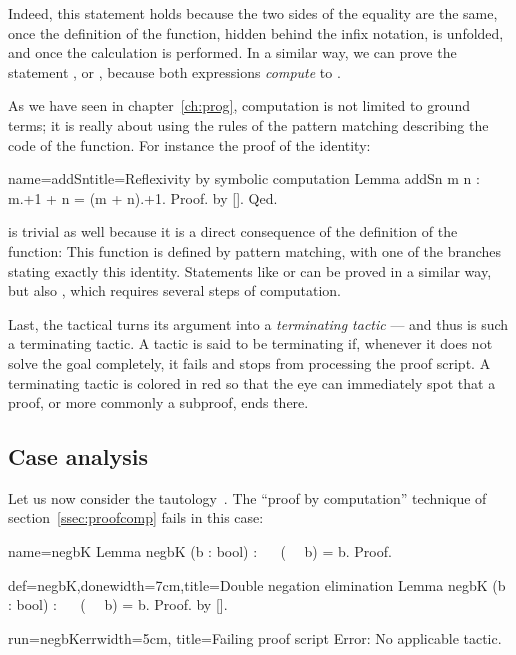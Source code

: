 Indeed, this statement holds because the two sides of the equality
are the same, once the definition of the  function, hidden
behind the infix \C{+} notation, is unfolded, and once the calculation
is performed. In a similar way, we can prove the statement
, or , because both expressions \emph{compute} to
.

As we have seen in chapter~\ref{ch:prog}, computation is not limited
to ground terms; it is really about using the rules of the pattern
matching describing the code of the function. For instance the proof
of the  identity:

\begin{coq}{name=addSn}{title=Reflexivity by symbolic computation}
Lemma addSn m n : m.+1 + n = (m + n).+1. Proof. by []. Qed.
\end{coq}
is trivial as well because it is a direct consequence of the
definition of the  function: This function is defined by
pattern matching, with one of the branches stating exactly this
identity. Statements like
 or  can be proved in a similar way, but
also , which requires several steps of computation.

Last, the  tactical turns its argument into a \emph{terminating
tactic} --- and thus   is such a terminating tactic. A tactic
is said to be terminating if, whenever it does not solve the goal
completely, it
fails and stops \Coq{} from processing the proof script.
A terminating tactic is colored in red so that
the eye can immediately spot that a
proof, or more commonly a subproof, ends there.

\subsection{Case analysis}\label{ssec:case}
Let us now consider the tautology~. The
``proof by computation'' technique of section~\ref{ssec:proofcomp}
fails in this case:

\begin{coqdef}{name=negbK}
Lemma negbK (b : bool) : ~~ (~~ b) = b.
Proof.
\end{coqdef}
\begin{coq-left}{def=negbK,done}{width=7cm,title=Double negation elimination}
Lemma negbK (b : bool) : ~~ (~~ b) = b.
Proof. by [].
\end{coq-left}
\begin{coqout-right}{run=negbKerr}{width=5cm, title=Failing proof script}
Error: No applicable tactic.
\end{coqout-right}

